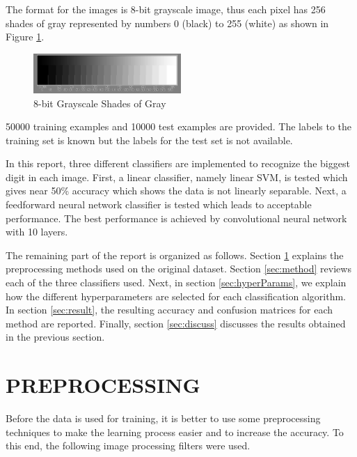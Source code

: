 \documentclass[letterpaper, 10 pt, conference]{ieeeconf}  %
\begin{document}
The format for the images is 8-bit grayscale image, thus each pixel has 256 shades of gray represented by numbers 0 (black) to 255 (white) as shown in Figure \ref{fig:maxeig2}.

\begin{figure}
	\begin{center}
			\includegraphics[width=0.5\textwidth]{figures/21stepwide8bit.jpg}  %
		\caption{8-bit Grayscale Shades of Gray}
		\label{fig:maxeig2}
	\end{center}
\end{figure}
50000 training examples and 10000 test examples are provided. The labels to the training set is known but the labels for the test set is not available.

In this report, three different classifiers are implemented to recognize the biggest digit in each image. First, a linear classifier, namely linear SVM, is tested which gives near 50\% accuracy which shows the data is not linearly separable. Next, a feedforward neural network classifier is tested which leads to acceptable performance. The best performance is achieved by convolutional neural network with 10 layers.

The remaining part of the report is organized as follows. Section \ref{sec:preprocess} explains the preprocessing methods used on the original dataset. Section \ref{sec:method} reviews each of the three classifiers used. Next, in section \ref{sec:hyperParams}, we explain how the different hyperparameters are selected for each classification algorithm. In section \ref{sec:result}, the resulting accuracy and confusion matrices for each method are reported. Finally, section \ref{sec:discuss} discusses the results obtained in the previous section.
\section{PREPROCESSING}\label{sec:preprocess}
Before the data is used for training, it is better to use some preprocessing techniques to make the learning process easier and to increase the accuracy. To this end, the following image processing filters were used. 
\end{document}

